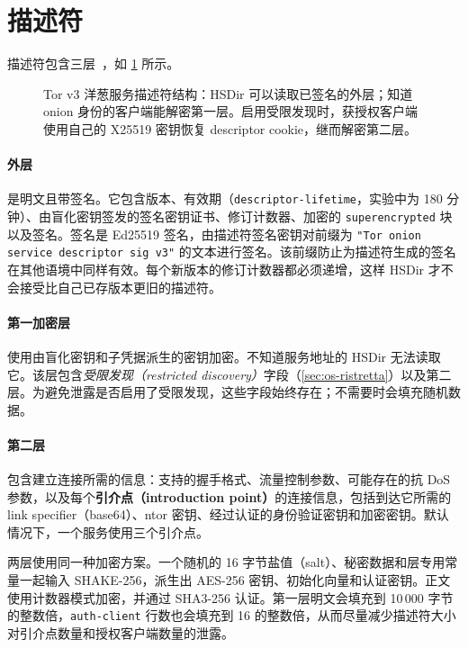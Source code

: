 \section{描述符}\label{sec:os-descrittore}

描述符包含三层~，如 \cref{fig:os-descrittore} 所示。

\begin{figure}[htbp]
\centering

\caption{Tor v3 洋葱服务描述符结构：HSDir 可以读取已签名的外层；知道 onion 身份的客户端能解密第一层。启用受限发现时，获授权客户端使用自己的 X25519 密钥恢复 descriptor cookie，继而解密第二层。}
\label{fig:os-descrittore}
\end{figure}

\paragraph{外层}是明文且带签名。它包含版本、有效期（\texttt{descriptor-lifetime}，实验中为 180 分钟）、由盲化密钥签发的签名密钥证书、修订计数器、加密的 \texttt{superencrypted} 块以及签名。签名是 Ed25519 签名，由描述符签名密钥对前缀为 \texttt{"Tor onion service descriptor sig v3"} 的文本进行签名。该前缀防止为描述符生成的签名在其他语境中同样有效。每个新版本的修订计数器都必须递增，这样 HSDir 才不会接受比自己已存版本更旧的描述符。

\paragraph{第一加密层}使用由盲化密钥和子凭据派生的密钥加密。不知道服务地址的 HSDir 无法读取它。该层包含\emph{受限发现（restricted discovery）}字段（\cref{sec:os-ristretta}）以及第二层。为避免泄露是否启用了受限发现，这些字段始终存在；不需要时会填充随机数据。

\paragraph{第二层}包含建立连接所需的信息：支持的握手格式、流量控制参数、可能存在的抗 DoS 参数，以及每个\textbf{引介点（introduction point）}的连接信息，包括到达它所需的 link specifier（base64）、ntor 密钥、经过认证的身份验证密钥和加密密钥。默认情况下，一个服务使用三个引介点。

两层使用同一种加密方案。一个随机的 16 字节盐值（salt）、秘密数据和层专用常量一起输入 SHAKE-256，派生出 AES-256 密钥、初始化向量和认证密钥。正文使用计数器模式加密，并通过 SHA3-256 认证。第一层明文会填充到 10\,000 字节的整数倍，\texttt{auth-client} 行数也会填充到 16 的整数倍，从而尽量减少描述符大小对引介点数量和授权客户端数量的泄露。

